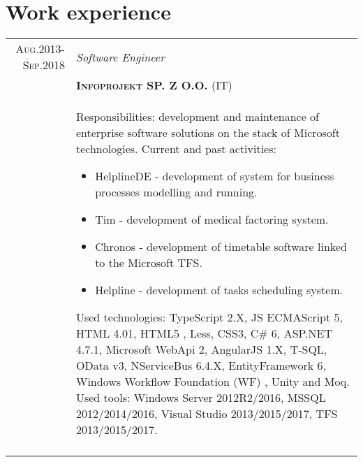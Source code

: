 \documentclass[a4paper,12pt]{article}
\begin{document}
\section{Work experience}
\begin{tabular}{r|p{12cm}}
\textsc{Aug.2013-Sep.2018}
	&\emph{Software Engineer} \\
	&\textsc{\textbf{Infoprojekt SP. Z O.O.}} (IT) \\
	&\footnotesize{
		Responsibilities: development and maintenance of enterprise software solutions on the stack of Microsoft technologies. \newline
		Current and past activities:
		\begin{itemize}
			\item HelplineDE - development of system for business processes modelling and running.
		        \item Tim -  development of medical factoring system.
		        \item Chronos - development of timetable software linked to the Microsoft TFS.
			\item Helpline - development of tasks scheduling system.
		\end{itemize}
		Used technologies: \newline
		TypeScript 2.X, JS ECMAScript 5, HTML 4.01, HTML5 , Less, CSS3, C\# 6, ASP.NET 4.7.1, Microsoft WebApi 2, AngularJS 1.X, T-SQL,
		OData v3, NServiceBus 6.4.X, EntityFramework 6, Windows Workflow Foundation (WF) , Unity and Moq. \newline
		Used tools: \newline
		Windows Server 2012R2/2016, MSSQL 2012/2014/2016, Visual Studio 2013/2015/2017, TFS 2013/2015/2017.
	}\\
	\multicolumn{2}{c}{}\\

\end{tabular}
\end{document}
